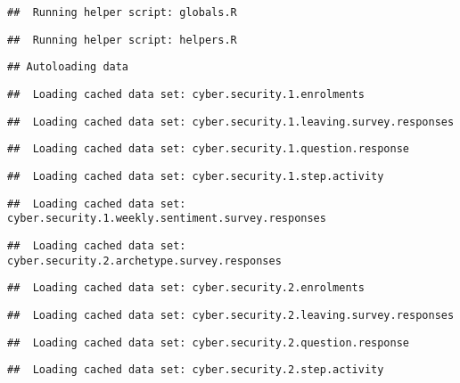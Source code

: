 \documentclass[]{article}
\begin{document}
\begin{verbatim}
##  Running helper script: globals.R
\end{verbatim}

\begin{verbatim}
##  Running helper script: helpers.R
\end{verbatim}

\begin{verbatim}
## Autoloading data
\end{verbatim}

\begin{verbatim}
##  Loading cached data set: cyber.security.1.enrolments
\end{verbatim}

\begin{verbatim}
##  Loading cached data set: cyber.security.1.leaving.survey.responses
\end{verbatim}

\begin{verbatim}
##  Loading cached data set: cyber.security.1.question.response
\end{verbatim}

\begin{verbatim}
##  Loading cached data set: cyber.security.1.step.activity
\end{verbatim}

\begin{verbatim}
##  Loading cached data set: cyber.security.1.weekly.sentiment.survey.responses
\end{verbatim}

\begin{verbatim}
##  Loading cached data set: cyber.security.2.archetype.survey.responses
\end{verbatim}

\begin{verbatim}
##  Loading cached data set: cyber.security.2.enrolments
\end{verbatim}

\begin{verbatim}
##  Loading cached data set: cyber.security.2.leaving.survey.responses
\end{verbatim}

\begin{verbatim}
##  Loading cached data set: cyber.security.2.question.response
\end{verbatim}

\begin{verbatim}
##  Loading cached data set: cyber.security.2.step.activity
\end{verbatim}
\end{document}
